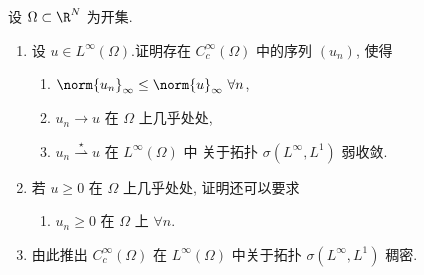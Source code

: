 \begin{exercise}
\label{exer:4.25}
设 $\Omega\subset\R^N$ 为开集.
\begin{enumerate}[label=\arabic*., leftmargin=2.2em, itemsep=0.35em]
	\item 设 $u\in L^\infty(\Omega)$.证明存在 $C_c^\infty(\Omega)$ 中的序列
	      $(u_n)$, 使得
	      \begin{enumerate}[label=(\alph*), leftmargin=2.4em, itemsep=0.1em]
	      	\item $\norm{u_n}_\infty\le\norm{u}_\infty\ \forall n$,
	      	\item $u_n\to u$ 在 $\Omega$ 上几乎处处,
	      	\item $u_n\overset{\star}{\rightharpoonup}u$ 在 $L^\infty(\Omega)$ 中
	      	      关于\wstar{}拓扑 $\sigma(L^\infty,L^1)$ 弱收敛.
	      \end{enumerate}
	\item 若 $u\ge0$ 在 $\Omega$ 上几乎处处, 证明还可以要求
	      \begin{enumerate}[label=(\alph*), leftmargin=2.4em, start=4, itemsep=0.1em]
	      	\item $u_n\ge0$ 在 $\Omega$ 上 $\forall n$.
	      \end{enumerate}
	\item 由此推出 $C_c^\infty(\Omega)$ 在 $L^\infty(\Omega)$ 中关于拓扑
	      $\sigma(L^\infty,L^1)$ 稠密.
\end{enumerate}
\end{exercise}

